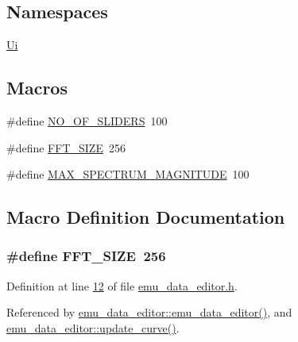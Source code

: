 \subsection*{Namespaces}
\begin{DoxyCompactItemize}
\item 
 \hyperlink{a00055}{Ui}
\end{DoxyCompactItemize}
\subsection*{Macros}
\begin{DoxyCompactItemize}
\item 
\#define \hyperlink{a00036_a958de936b60eb9d784cdb10be7d39373}{N\+O\+\_\+\+O\+F\+\_\+\+S\+L\+I\+D\+E\+R\+S}~100
\item 
\#define \hyperlink{a00036_a636ddc19af00bc87969a07c88331f105}{F\+F\+T\+\_\+\+S\+I\+Z\+E}~256
\item 
\#define \hyperlink{a00036_a60ece807960441ee99b05b2e536cad76}{M\+A\+X\+\_\+\+S\+P\+E\+C\+T\+R\+U\+M\+\_\+\+M\+A\+G\+N\+I\+T\+U\+D\+E}~100
\end{DoxyCompactItemize}


\subsection{Macro Definition Documentation}
\hypertarget{a00036_a636ddc19af00bc87969a07c88331f105}{
\subsubsection[{F\+F\+T\+\_\+\+S\+I\+Z\+E}]{\setlength{\rightskip}{0pt plus 5cm}\#define F\+F\+T\+\_\+\+S\+I\+Z\+E~256}}\label{a00036_a636ddc19af00bc87969a07c88331f105}


Definition at line \hyperlink{a00036_source_l00012}{12} of file \hyperlink{a00036_source}{emu\+\_\+data\+\_\+editor.\+h}.



Referenced by \hyperlink{a00035_source_l00012}{emu\+\_\+data\+\_\+editor\+::emu\+\_\+data\+\_\+editor()}, and \hyperlink{a00035_source_l00284}{emu\+\_\+data\+\_\+editor\+::update\+\_\+curve()}.

